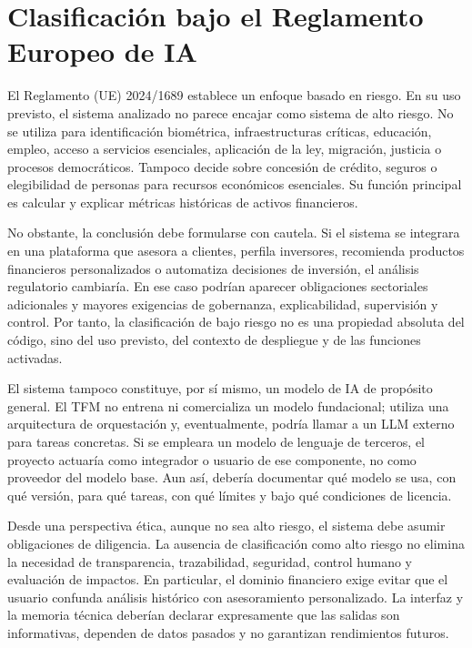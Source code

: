 \documentclass{article}
\begin{document}
\section{Clasificación bajo el Reglamento Europeo de IA}

El Reglamento (UE) 2024/1689 establece un enfoque basado en riesgo. En su uso previsto, el sistema analizado no parece encajar como sistema de alto riesgo. No se utiliza para identificación biométrica, infraestructuras críticas, educación, empleo, acceso a servicios esenciales, aplicación de la ley, migración, justicia o procesos democráticos. Tampoco decide sobre concesión de crédito, seguros o elegibilidad de personas para recursos económicos esenciales. Su función principal es calcular y explicar métricas históricas de activos financieros.

No obstante, la conclusión debe formularse con cautela. Si el sistema se integrara en una plataforma que asesora a clientes, perfila inversores, recomienda productos financieros personalizados o automatiza decisiones de inversión, el análisis regulatorio cambiaría. En ese caso podrían aparecer obligaciones sectoriales adicionales y mayores exigencias de gobernanza, explicabilidad, supervisión y control. Por tanto, la clasificación de bajo riesgo no es una propiedad absoluta del código, sino del uso previsto, del contexto de despliegue y de las funciones activadas.

El sistema tampoco constituye, por sí mismo, un modelo de IA de propósito general. El TFM no entrena ni comercializa un modelo fundacional; utiliza una arquitectura de orquestación y, eventualmente, podría llamar a un LLM externo para tareas concretas. Si se empleara un modelo de lenguaje de terceros, el proyecto actuaría como integrador o usuario de ese componente, no como proveedor del modelo base. Aun así, debería documentar qué modelo se usa, con qué versión, para qué tareas, con qué límites y bajo qué condiciones de licencia.

Desde una perspectiva ética, aunque no sea alto riesgo, el sistema debe asumir obligaciones de diligencia. La ausencia de clasificación como alto riesgo no elimina la necesidad de transparencia, trazabilidad, seguridad, control humano y evaluación de impactos. En particular, el dominio financiero exige evitar que el usuario confunda análisis histórico con asesoramiento personalizado. La interfaz y la memoria técnica deberían declarar expresamente que las salidas son informativas, dependen de datos pasados y no garantizan rendimientos futuros.
\end{document}
